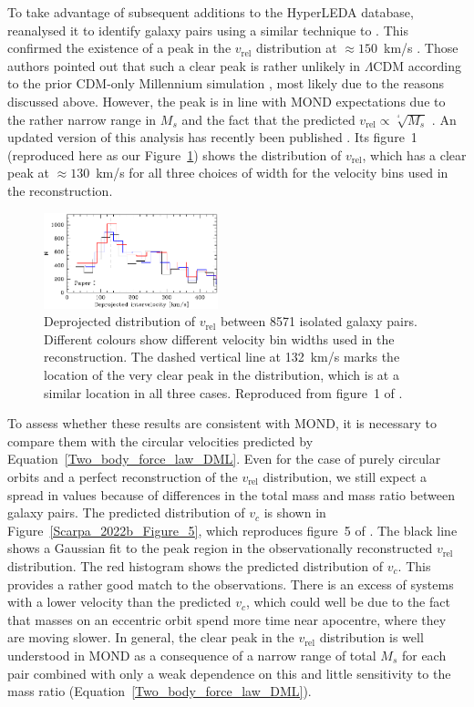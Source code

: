 \documentclass[fleqn,usenatbib,useAMS]{mnras} %
\begin{document}
To take advantage of subsequent additions to the HyperLEDA database, \citet{Scarpa_2022a} reanalysed it to identify galaxy pairs using a similar technique to \citet{Nottale_2020}. This confirmed the existence of a peak in the $v_{\text{rel}}$ distribution at $\approx 150$~km/s \citep[see figure~1 of][]{Scarpa_2022a}. Those authors pointed out that such a clear peak is rather unlikely in $\Lambda$CDM according to the prior CDM-only Millennium simulation \citep{Moreno_2013}, most likely due to the reasons discussed above. However, the peak is in line with MOND expectations due to the rather narrow range in $M_s$ and the fact that the predicted $v_{\text{rel}} \propto \sqrt[^4]{M_s}$ \citep[see figure~7 of][]{Scarpa_2022a}. An updated version of this analysis has recently been published \citep{Scarpa_2022b}. Its figure~1 (reproduced here as our Figure~\ref{Scarpa_2022b_Figure_1}) shows the distribution of $v_{\text{rel}}$, which has a clear peak at $\approx 130$~km/s for all three choices of width for the velocity bins used in the reconstruction.

\begin{figure}
	\centering
	\includegraphics[width=0.45\textwidth]{Scarpa_2022b_Figure_1}
	\caption{Deprojected distribution of $v_{\text{rel}}$ between 8571 isolated galaxy pairs. Different colours show different velocity bin widths used in the reconstruction. The dashed vertical line at 132~km/s marks the location of the very clear peak in the distribution, which is at a similar location in all three cases. Reproduced from figure~1 of \citet{Scarpa_2022b}.}
	\label{Scarpa_2022b_Figure_1}
\end{figure}

To assess whether these results are consistent with MOND, it is necessary to compare them with the circular velocities predicted by Equation~\ref{Two_body_force_law_DML}. Even for the case of purely circular orbits and a perfect reconstruction of the $v_{\text{rel}}$ distribution, we still expect a spread in values because of differences in the total mass and mass ratio between galaxy pairs. The predicted distribution of $v_c$ is shown in Figure~\ref{Scarpa_2022b_Figure_5}, which reproduces figure~5 of \citet{Scarpa_2022b}. The black line shows a Gaussian fit to the peak region in the observationally reconstructed $v_{\text{rel}}$ distribution. The red histogram shows the predicted distribution of $v_c$. This provides a rather good match to the observations. There is an excess of systems with a lower velocity than the predicted $v_c$, which could well be due to the fact that masses on an eccentric orbit spend more time near apocentre, where they are moving slower. In general, the clear peak in the $v_{\text{rel}}$ distribution is well understood in MOND as a consequence of a narrow range of total $M_s$ for each pair combined with only a weak dependence on this and little sensitivity to the mass ratio (Equation~\ref{Two_body_force_law_DML}).
\end{document}
